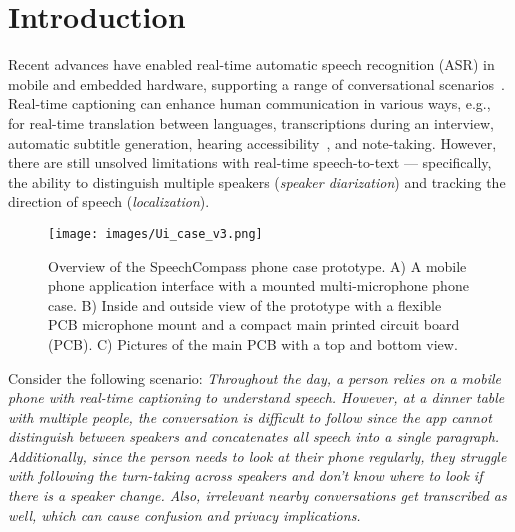 \section{Introduction}
Recent advances have enabled real-time automatic speech recognition (ASR) in mobile and embedded hardware, supporting a range of conversational scenarios~\cite{LiveTranscribe, TranslatorMicrosoft}. Real-time captioning can enhance human communication in various ways, e.g., for real-time translation between languages, transcriptions during an interview, automatic subtitle generation, hearing accessibility~\cite{designing_asr_for_deaf, tracked_asr_study}, and note-taking. 
However, there are still unsolved limitations with real-time speech-to-text --- specifically, the ability to distinguish multiple speakers (\textit{speaker diarization}) and tracking the direction of speech (\textit{localization}). 


\begin{figure*}
  \centering
  \texttt{[image: images/Ui\_case\_v3.png]}
  \caption{Overview of the SpeechCompass phone case prototype. A) A mobile phone application interface with a mounted multi-microphone phone case. B) Inside and outside view of the prototype with a flexible PCB microphone mount and a compact main printed circuit board (PCB). C) Pictures of the main PCB with a top and bottom view. }
  \label{fig:pcb_design}  
\end{figure*}

Consider the following scenario: 
\textit{Throughout the day, a person relies on a mobile phone with real-time captioning to understand speech.
However, at a dinner table with multiple people, the conversation is difficult to follow since the app cannot distinguish between speakers and concatenates all speech into a single paragraph.
Additionally, since the person needs to look at their phone regularly, they struggle with following the turn-taking across speakers and don't know where to look if there is a speaker change. Also, irrelevant nearby conversations get transcribed as well, which can cause confusion and privacy implications.  }

